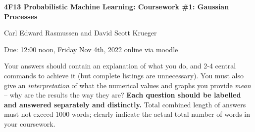 \documentclass[11pt]{article}
\begin{document}
\centerline{\large\bf 4F13 Probabilistic Machine Learning: Coursework \#1: Gaussian Processes}

\vspace{0.3cm}

\centerline{Carl Edward Rasmussen and David Scott Krueger} 

\vspace{0.2cm}

\centerline{Due: 12:00 noon, Friday Nov 4th, 2022 online via moodle}

\vspace{2mm}

Your answers should contain an explanation of what you do, and 2-4
central commands to achieve it (but complete listings are
unnecessary). You must also give an \emph{interpretation} of what the
numerical values and graphs you provide \emph{mean} -- why are the
results the way they are? {\bf Each question should be labelled and
  answered separately and distinctly.} Total combined length of
answers must not exceed $1000$ words; clearly indicate the actual total
number of words in your coursework.
\end{document}
